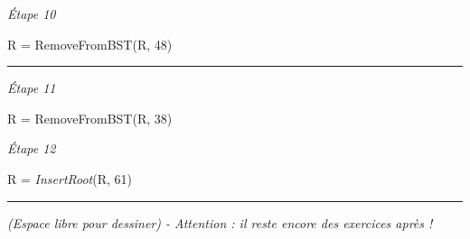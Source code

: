 \documentclass[11pt,a4paper]{article}
\begin{document}
\begin{center}
\begin{table}[ht!]
\begin{minipage}{0.50\textwidth}
\textit{\'Etape 10}

R = RemoveFromBST(R, 48)

\vspace*{7cm}

  \end{minipage}
\end{table}

\vspace*{-0.5cm}
\rule{1.0\linewidth}{0.75pt}



\begin{table}[ht!]
  \centering
  \begin{minipage}{0.50\textwidth}
    \centering

\textit{\'Etape 11}

R = RemoveFromBST(R, 38)

\vspace*{7cm}

  \end{minipage}
  \hfillx
  \begin{minipage}{0.50\textwidth}
    \centering

\textit{\'Etape 12}

R = \textit{InsertRoot}(R, 61)

\vspace*{7cm}

  \end{minipage}
\end{table}

\vspace*{-0.5cm}
\rule{1.0\linewidth}{0.75pt}

%
%
%
%
%

\end{center}

\textit{(Espace libre pour dessiner) - Attention : il reste encore des exercices après !}

\clearpage
\end{document}
